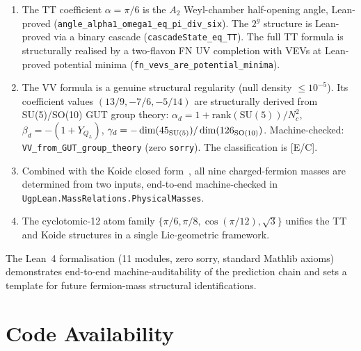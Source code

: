 \documentclass[11pt]{article}
\theoremstyle{remark}
\newcommand{\lean}[1]{\texttt{\small#1}}
\begin{document}
\begin{enumerate}
  \item The TT coefficient $\alpha=\pi/6$ is the $A_2$ Weyl-chamber half-opening
    angle, Lean-proved (\lean{angle\_alpha1\_omega1\_eq\_pi\_div\_six}).
    The $2^g$ structure is Lean-proved via a binary cascade
    (\lean{cascadeState\_eq\_TT}).
    The full TT formula is structurally realised by a two-flavon FN UV
    completion with VEVs at Lean-proved potential minima
    (\lean{fn\_vevs\_are\_potential\_minima}).

  \item The VV formula is a genuine structural regularity (null density $\leq10^{-5}$).  Its coefficient values $(13/9,-7/6,-5/14)$ are structurally derived from SU(5)/SO(10) GUT group theory: $\alpha_d = 1 + \mathrm{rank}(\mathrm{SU}(5))/N_c^2$, $\beta_d = -(1+Y_{Q_L})$, $\gamma_d = -\dim(45_{\rm SU(5)})/\dim(126_{\rm SO(10)})$.  Machine-checked: \lean{VV\_from\_GUT\_group\_theory} (zero \texttt{sorry}).  The classification is [E/C].

  \item Combined with the Koide closed form~\cite{Spivack2026_Koide}, all nine
    charged-fermion masses are determined from two inputs, end-to-end
    machine-checked in \lean{UgpLean.MassRelations.PhysicalMasses}.

  \item The cyclotomic-12 atom family $\{\pi/6, \pi/8, \cos(\pi/12), \sqrt{3}\}$
    unifies the TT and Koide structures in a single Lie-geometric framework.
\end{enumerate}

The Lean~4 formalisation (11 modules, zero sorry, standard Mathlib axioms)
demonstrates end-to-end machine-auditability of the prediction chain and sets
a template for future fermion-mass structural identifications.

\section*{Code Availability}
\end{document}
